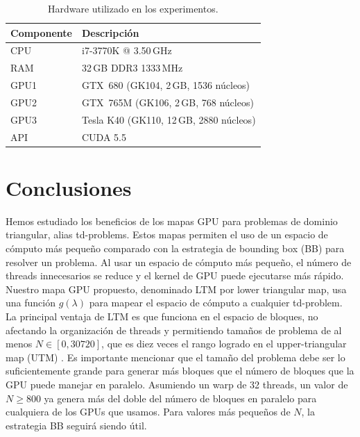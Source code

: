 \documentclass[twocolumn,10pt,a4paper]{article}
\begin{document}
\begin{table}[H]
\centering
\caption{Hardware utilizado en los experimentos.}
\label{tab:hardware}
\small
\begin{tabular}{ll}
\toprule
\textbf{Componente} & \textbf{Descripción} \\
\midrule
CPU  & i7-3770K @ 3.50\,GHz \\
RAM  & 32\,GB DDR3 1333\,MHz \\
GPU1 & GTX~680 (GK104, 2\,GB, 1536 núcleos) \\
GPU2 & GTX~765M (GK106, 2\,GB, 768 núcleos) \\
GPU3 & Tesla K40 (GK110, 12\,GB, 2880 núcleos) \\
API  & CUDA 5.5 \\
\bottomrule
\end{tabular}
\end{table}

\section{Conclusiones}
\label{sec:conclusions}

Hemos estudiado los beneficios de los mapas GPU para problemas de dominio
triangular, alias td-problems. Estos mapas permiten el uso de un espacio de
cómputo más pequeño comparado con la estrategia de bounding box (BB) para
resolver un problema. Al usar un espacio de cómputo más pequeño, el número de
threads innecesarios se reduce y el kernel de GPU puede ejecutarse más rápido.
Nuestro mapa GPU propuesto, denominado LTM por lower triangular map, usa una
función $g(\lambda)$ para mapear el espacio de cómputo a cualquier td-problem.
La principal ventaja de LTM es que funciona en el espacio de bloques, no
afectando la organización de threads y permitiendo tamaños de problema de al
menos $N \in [0, 30720]$, que es diez veces el rango logrado en el
upper-triangular map (UTM) \cite{ref1}. Es importante mencionar que el tamaño
del problema debe ser lo suficientemente grande para generar más bloques que el
número de bloques que la GPU puede manejar en paralelo. Asumiendo un warp de 32
threads, un valor de $N \geq 800$ ya genera más del doble del número de bloques
en paralelo para cualquiera de los GPUs que usamos. Para valores más pequeños
de $N$, la estrategia BB seguirá siendo útil.
\end{document}
